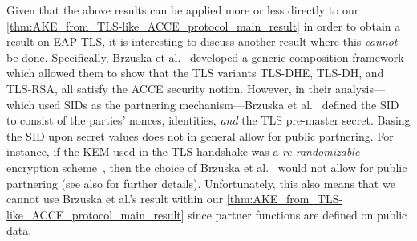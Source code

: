 Given that the above results can be applied more or less directly to  our \cref{thm:AKE_from_TLS-like_ACCE_protocol_main_result} in order to obtain a result on EAP-TLS,
it is interesting to discuss another result where this \emph{cannot} be done.
Specifically,
Brzuska et al.~\cite{BrzuskaFSWW:2012:less_is_more} developed a generic composition framework which allowed them to show that the TLS variants TLS-DHE, TLS-DH, and TLS-RSA,
all satisfy the ACCE security notion.
However,
in their analysis---which used SIDs as the partnering mechanism---Brzuska et al.~\cite{BrzuskaFSWW:2012:less_is_more} defined the SID to consist of the parties' nonces, identities,
\emph{and}  the TLS pre-master secret.
Basing the SID upon secret values does not in general allow for public partnering.
For instance,
if the KEM used in the TLS handshake was a \emph{re-randomizable} encryption scheme~\cite{C:CanKraNie03,C:PraRos07},
then the choice of Brzuska et al.~\cite{BrzuskaFSWW:2012:less_is_more} would not allow for public partnering
(see also \cite{CCS:BFWW11} for further details).
Unfortunately,
this also means that we cannot use Brzuska et al.'s result within our \cref{thm:AKE_from_TLS-like_ACCE_protocol_main_result} since partner functions are defined on public data.






